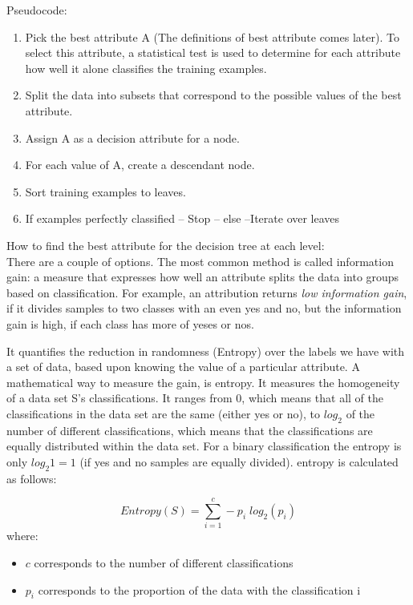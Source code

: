 \documentclass[12pt]{report}
\begin{document}
Pseudocode:
\begin{enumerate}
\item Pick the best attribute A (The definitions of best attribute comes later). To select this attribute, a statistical test is used to determine for each attribute how well it alone classifies the training examples.
\item Split the data into subsets that correspond to the possible values of the best attribute.
\item Assign A as a decision attribute for a node.
\item For each value of A, create a descendant node.
\item Sort training examples to leaves.
\item If examples perfectly classified --	Stop -- else --Iterate over leaves	
\end{enumerate}	


How to find the best attribute for the decision tree at each level: \\
There are a couple of options. The most common method is called information gain: a measure that expresses how well an attribute splits the data into groups based on classification. For example, an attribution returns \textit{low information gain}, if it divides samples to two classes with an even yes and no, but the information gain is high, if each class has more of yeses or nos.

It quantifies the reduction in randomness (Entropy) over the labels we have with a set of data, based upon knowing the value of a particular attribute. A mathematical way to measure the gain, is entropy. It measures the homogeneity of a data set S's  classifications. It ranges from 0, which means that all of the classifications in the data set are the same (either yes or no), to $log_{2}$ of the number of different classifications, which means that the classifications are equally distributed within the data set. For a binary classification the entropy is only $log_{2} 1 = 1$ (if yes and no samples are equally divided). entropy is calculated as follows: 

\begin{equation}
Entropy(S) = \sum_{i=1}^{c} -p_{i} \; log_{2} (p_{i})
\end{equation}
where:
\begin{itemize}
\item $c$ corresponds to the number of different classifications 
\item $p_{i}$ corresponds to the proportion of the data with the classification i
\end{itemize}
\end{document}
